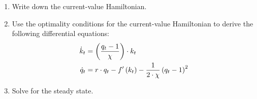 \documentclass[letterpaper,12pt,leqno]{article}
\begin{document}
\begin{enumerate}
\item Write down the current-value Hamiltonian. 
\item Use the optimality conditions for the current-value Hamiltonian to derive the following differential equations:
\begin{align*}
\dot{k}_{t} &=\left( \frac{q_{t}-1}{\chi} \right)\cdot  k_{t} \\
\dot{q}_{t} &=r\cdot q_{t}-f'\left( k_{t} \right) -\frac{1}{2\cdot \chi}\left( q_{t}-1 \right)^{2}
\end{align*}

\item Solve for the steady state.
\end{enumerate}
\end{document}
